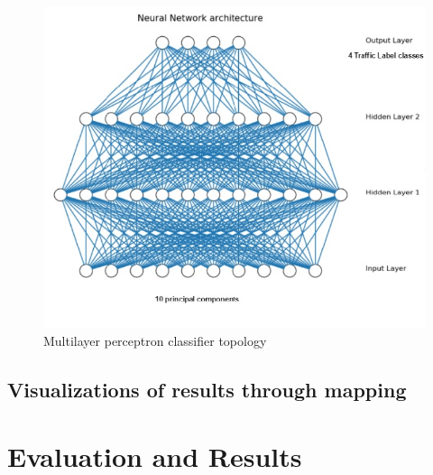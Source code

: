 \documentclass[12pt, a4paper]{report}
\theoremstyle{definition}
\theoremstyle{definition}%
\theoremstyle{definition}%
\theoremstyle{definition}%
\theoremstyle{definition}%
\theoremstyle{definition}%
\begin{document}
\begin{figure}[h]	
	\includegraphics[scale=0.50]{ann_topology.jpg}
	\centering
	\caption{Multilayer perceptron classifier topology }
	\label{fig:ann_topology}
\end{figure}

 



\section{Visualizations of results through mapping}








\chapter{Evaluation and Results}
\end{document}
